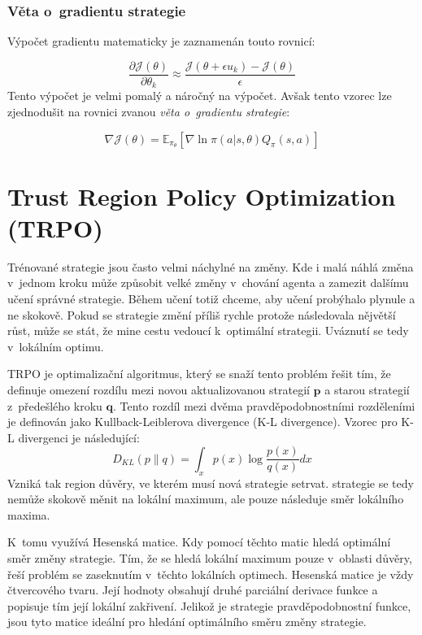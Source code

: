 \subsubsection*{Věta o~gradientu strategie}
Výpočet gradientu matematicky je zaznamenán touto rovnicí:

\begin{equation}
  \label{eq:gradient_strategie}
  \frac{\partial \mathcal{J}(\theta)}{\partial \theta_k} \approx \frac{\mathcal{J}(\theta + \epsilon u_k) - \mathcal{J}(\theta)}{\epsilon}
\end{equation}
Tento výpočet je velmi pomalý a náročný na výpočet.
Avšak tento vzorec lze zjednodušit na rovnici zvanou \emph{věta o~gradientu strategie}:

\begin{equation}
    \label{eq:veta_o_gradientu_strategie}
  \nabla \mathcal{J}(\theta) = \mathbb{E}_{\pi_\theta} [\nabla \ln \pi(a \vert s, \theta) Q_\pi(s, a)]
\end{equation}

\section{Trust Region Policy Optimization (TRPO)}\label{sec:trust-region-policy-optimization}
Trénované strategie jsou často velmi náchylné na změny.
Kde i malá náhlá změna v~jednom kroku může způsobit velké změny v~chování agenta a zamezit dalšímu učení správné strategie.
Během učení totiž chceme, aby učení probýhalo plynule a ne skokově.
Pokud se strategie změní příliš rychle protože následovala nějvětší růst, může se stát, že mine cestu vedoucí k~optimální strategii.
Uváznutí se tedy v~lokálním optimu.\pagebreak

TRPO je optimalizační algoritmus, který se snaží tento problém řešit tím, že definuje omezení rozdílu mezi novou aktualizovanou strategií $\textbf{p}$ a starou strategií z~předešlého kroku $\textbf{q}$.
Tento rozdíl mezi dvěma pravděpodobnostními rozděleními je definován jako Kullback-Leiblerova divergence (K-L divergence)\cite{KL_divergence}.
Vzorec pro K-L divergenci je následující:
\begin{equation}
  D_{KL}(p \| q) = \int_x p(x) \log \frac{p(x)}{q(x)} dx
\end{equation}
Vzniká tak region důvěry, ve kterém musí nová strategie setrvat.
strategie se tedy nemůže skokově měnit na lokální maximum, ale pouze následuje směr lokálního maxima.

K~tomu využívá Hesenská matice.
Kdy pomocí těchto matic hledá optimální směr změny strategie.
Tím, že se hledá lokální maximum pouze v~oblasti důvěry, řeší problém se zaseknutím v~těchto lokálních optimech.
Hesenská matice je vždy čtvercového tvaru.
Její hodnoty obsahují druhé parciální derivace funkce a popisuje tím její lokální zakřivení.
Jelikož je strategie pravděpodobnostní funkce, jsou tyto matice ideální pro hledání optimálního směru změny strategie.

